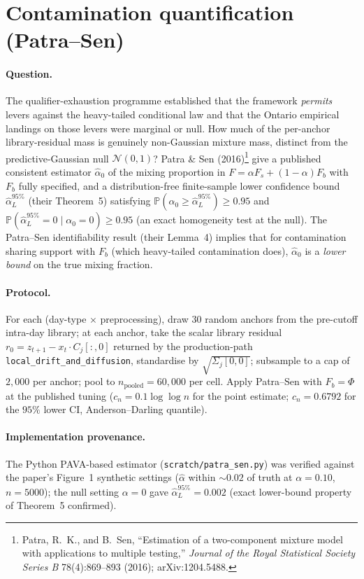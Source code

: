 \documentclass[11pt]{article}
\begin{document}
\section{Contamination quantification (Patra--Sen)}
\label{sec:patra-sen}

\paragraph{Question.} The qualifier-exhaustion programme established
that the framework \emph{permits} levers against the heavy-tailed
conditional law and that the Ontario empirical landings on those
levers were marginal or null. How much of the per-anchor
library-residual mass is genuinely non-Gaussian mixture mass,
distinct from the predictive-Gaussian null \(\mathcal{N}(0,1)\)?
Patra \& Sen (2016)\footnote{Patra, R.\ K.,
and B.\ Sen, ``Estimation of a two-component mixture model with
applications to multiple testing,'' \emph{Journal of the Royal
Statistical Society Series B} 78(4):869--893 (2016); arXiv:1204.5488.}
give a published consistent estimator \(\hat\alpha_0\) of the mixing
proportion in \(F = \alpha F_s + (1-\alpha) F_b\) with \(F_b\) fully
specified, and a distribution-free finite-sample lower confidence
bound \(\hat\alpha_L^{95\%}\) (their Theorem~5) satisfying
\(\mathbb{P}(\alpha_0 \geq \hat\alpha_L^{95\%}) \geq 0.95\) and
\(\mathbb{P}(\hat\alpha_L^{95\%} = 0 \mid \alpha_0 = 0) \geq 0.95\)
(an exact homogeneity test at the null). The Patra--Sen
identifiability result (their Lemma~4) implies that for
contamination sharing support with \(F_b\) (which heavy-tailed
contamination does), \(\hat\alpha_0\) is a \emph{lower bound} on
the true mixing fraction.

\paragraph{Protocol.} For each (day-type \(\times\) preprocessing),
draw 30 random anchors from the pre-cutoff intra-day library; at
each anchor, take the scalar library residual
\(r_0 = z_{t+1} - x_t \cdot C_j[:,0]\) returned by the production-path
\texttt{local\_drift\_and\_diffusion}, standardise by
\(\sqrt{\Sigma_j[0,0]}\); subsample to a cap of \(2{,}000\) per
anchor; pool to \(n_{\mathrm{pooled}} = 60{,}000\) per cell. Apply
Patra--Sen with \(F_b = \Phi\) at the published tuning
(\(c_n = 0.1 \log\log n\) for the point estimate; \(c_n = 0.6792\)
for the \(95\%\) lower CI, Anderson--Darling quantile).

\paragraph{Implementation provenance.} The Python PAVA-based
estimator (\texttt{scratch/patra\_sen.py}) was verified
against the paper's Figure~1 synthetic settings
(\(\hat\alpha\) within \(\sim 0.02\) of truth at \(\alpha = 0.10\),
\(n = 5000\)); the null setting \(\alpha = 0\) gave
\(\hat\alpha_L^{95\%} = 0.002\) (exact lower-bound property of
Theorem~5 confirmed).
\end{document}
